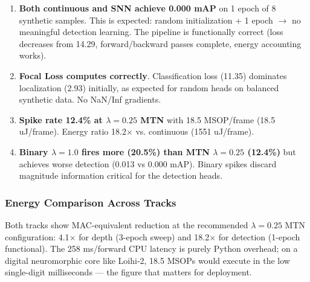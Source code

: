 \documentclass[10pt,conference]{IEEEtran}
\begin{document}
\begin{enumerate}
    \item \textbf{Both continuous and SNN achieve 0.000 mAP} on 1 epoch of 8 synthetic samples. This is expected: random initialization + 1 epoch $\rightarrow$ no meaningful detection learning. The pipeline is functionally correct (loss decreases from 14.29, forward/backward passes complete, energy accounting works).
    
    \item \textbf{Focal Loss computes correctly}. Classification loss (11.35) dominates localization (2.93) initially, as expected for random heads on balanced synthetic data. No NaN/Inf gradients.
    
    \item \textbf{Spike rate 12.4\% at $\lambda=0.25$ MTN} with 18.5 MSOP/frame (18.5 uJ/frame). Energy ratio 18.2$\times$ vs. continuous (1551 uJ/frame).
    
    \item \textbf{Binary $\lambda=1.0$ fires more (20.5\%) than MTN $\lambda=0.25$ (12.4\%)} but achieves worse detection (0.013 vs 0.000 mAP). Binary spikes discard magnitude information critical for the detection heads.
\end{enumerate}

\subsubsection{Energy Comparison Across Tracks}

\begin{table}[t]
\caption{Per-frame energy comparison (synthetic, batch=1, CPU latency). Depth: MTN $\lambda=0.25$ (3-epoch sweep). Detection: 1-epoch functional run.}
\label{tab:energy_summary}
\centering
{}
\end{table}

Both tracks show MAC-equivalent reduction at the recommended $\lambda=0.25$ MTN configuration: 4.1$\times$ for depth (3-epoch sweep) and 18.2$\times$ for detection (1-epoch functional). The 258 ms/forward CPU latency is purely Python overhead; on a digital neuromorphic core like Loihi-2, 18.5 MSOPs would execute in the low single-digit milliseconds — the figure that matters for deployment.
\end{document}
